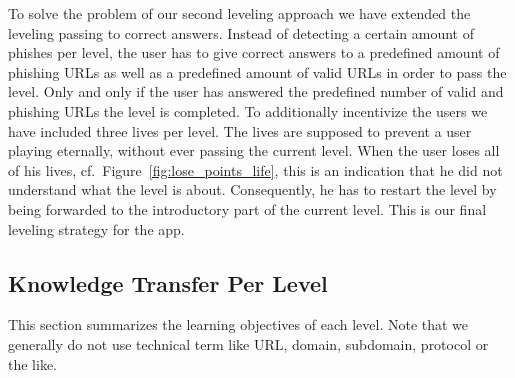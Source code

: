 \begin{description}[leftmargin=0cm]
	\item[Leveling Based on Correct Answers] To solve the problem of our second leveling approach we have extended the leveling passing to correct answers. Instead of detecting a certain amount of phishes per level, the user has to give correct answers to a predefined amount of phishing URLs as well as a predefined amount of valid URLs in order to pass the level. Only and only if the user has answered the predefined number of valid and phishing URLs the level is completed. To additionally incentivize the users we have included three lives per level. The lives are supposed to prevent a user playing eternally, without ever passing the current level. When the user loses all of his lives, cf.~Figure~\ref{fig:lose_points_life}, this is an indication that he did not understand what the level is about. Consequently, he has to restart the level by being forwarded to the introductory part of the current level. This is our final leveling strategy for the app.
\end{description}


\subsection{Knowledge Transfer Per Level}
\label{s:knowledgetransferperlevel}
This section summarizes the learning objectives of each level. Note that we generally do not use technical term like URL, domain, subdomain, protocol or the like.


